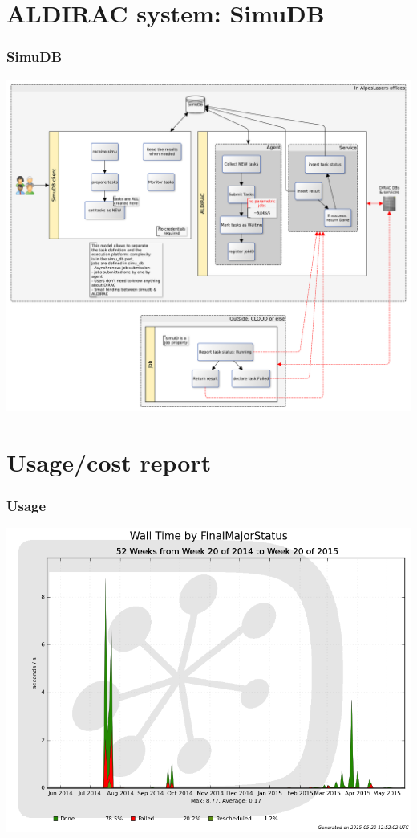 \documentclass[14pt]{beamer}
\begin{document}
\section{ALDIRAC system: SimuDB}
\begin{frame}
\frametitle{SimuDB}
\centering
\includegraphics[width=\textwidth]{Architecture1.pdf}
\end{frame}

\section{Usage/cost report}
\begin{frame}
\frametitle{Usage}
\centering
\includegraphics[width=\textwidth]{walltime.png}
\end{frame}
\end{document}
